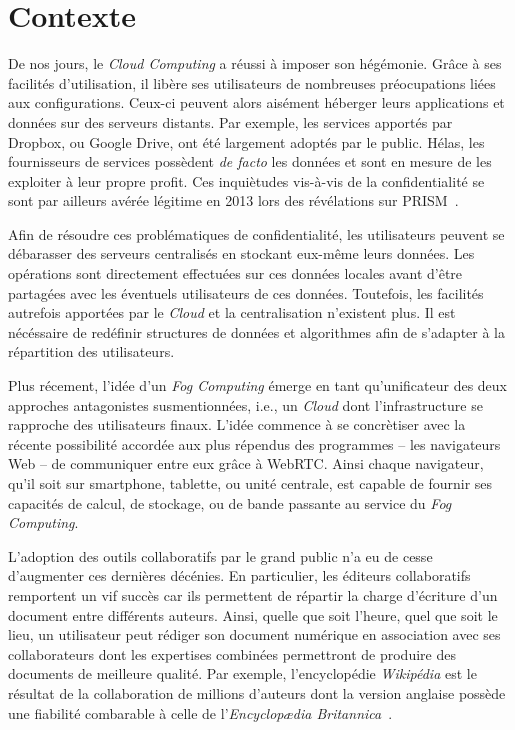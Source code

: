 
\section{Contexte}

De nos jours, le \emph{Cloud Computing} a réussi à imposer son hégémonie. Grâce
à ses facilités d'utilisation, il libère ses utilisateurs de nombreuses
préocupations liées aux configurations. Ceux-ci peuvent alors aisément héberger
leurs applications et données sur des serveurs distants. Par exemple, les
services apportés par Dropbox, ou Google Drive, ont été largement adoptés par le
public.  Hélas, les fournisseurs de services possèdent \emph{de facto} les
données et sont en mesure de les exploiter à leur propre profit. Ces inquiètudes
vis-à-vis de la confidentialité se sont par ailleurs avérée légitime en 2013
lors des révélations sur PRISM~\cite{gellman2013us}.

Afin de résoudre ces problématiques de confidentialité, les utilisateurs peuvent
se débarasser des serveurs centralisés en stockant eux-même leurs données. Les
opérations sont directement effectuées sur ces données locales avant d'être
partagées avec les éventuels utilisateurs de ces données. Toutefois, les
facilités autrefois apportées par le \emph{Cloud} et la centralisation
n'existent plus. Il est nécéssaire de redéfinir structures de données et
algorithmes afin de s'adapter à la répartition des utilisateurs.

Plus récement, l'idée d'un \emph{Fog Computing} émerge en tant qu'unificateur
des deux approches antagonistes susmentionnées, i.e., un \emph{Cloud} dont
l'infrastructure se rapproche des utilisateurs finaux. L'idée commence à se
concrètiser avec la récente possibilité accordée aux plus répendus des
programmes -- les navigateurs Web -- de communiquer entre eux grâce à
WebRTC. Ainsi chaque navigateur, qu'il soit sur smartphone, tablette, ou unité
centrale, est capable de fournir ses capacités de calcul, de stockage, ou de
bande passante au service du \emph{Fog Computing}.


L'adoption des outils collaboratifs par le grand public n'a eu de cesse
d'augmenter ces dernières décénies. En particulier, les éditeurs
collaboratifs~\cite{ellis1991groupware} remportent un vif succès car ils
permettent de répartir la charge d'écriture d'un document entre différents
auteurs. Ainsi, quelle que soit l'heure, quel que soit le lieu, un utilisateur
peut rédiger son document numérique en association avec ses collaborateurs dont
les expertises combinées permettront de produire des documents de meilleure
qualité. Par exemple, l'encyclopédie \emph{Wikipédia} est le résultat de la
collaboration de millions d'auteurs dont la version anglaise possède une
fiabilité combarable à celle de l'\emph{Encyclop\ae{}dia
Britannica}~\cite{giles2005internet}.

